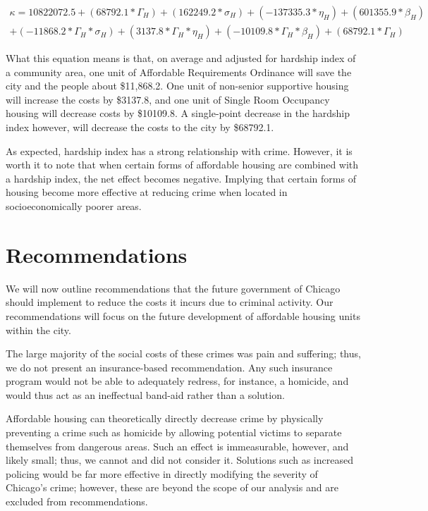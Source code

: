 \documentclass{article}
\begin{document}
\begin{onehalfspacing}
\begin{multline*}
    \kappa = 10822072.5 + (68792.1 * \Gamma_H) + (162249.2 * \sigma_H) + (-137335.3 * \eta_H) + (601355.9 * \beta_H) \\
    + (-11868.2 * \Gamma_H * \sigma_H) + (3137.8 * \Gamma_H * \eta_H) + (-10109.8 * \Gamma_H * \beta_H) + (68792.1 * \Gamma_H)
\end{multline*}

What this equation means is that, on average and adjusted for hardship index of a community area, one unit of Affordable Requirements Ordinance will save the city and the people about \$11,868.2. One unit of non-senior supportive housing will increase the costs by \$3137.8, and one unit of Single Room Occupancy housing will decrease costs by \$10109.8. A single-point decrease in the hardship index however, will decrease the costs to the city by \$68792.1.

As expected, hardship index has a strong relationship with crime. However, it is worth it to note that when certain forms of affordable housing are combined with a hardship index, the net effect becomes negative. Implying that certain forms of housing become more effective at reducing crime when located in socioeconomically poorer areas.

\section{Recommendations}
We will now outline recommendations that the future government of Chicago should implement to reduce the costs it incurs due to criminal activity. Our recommendations will focus on the future development of affordable housing units within the city. 

The large majority of the social costs of these crimes was pain and suffering; thus, we do not present an insurance-based recommendation. Any such insurance program would not be able to adequately redress, for instance, a homicide, and would thus act as an ineffectual band-aid rather than a solution.

Affordable housing can theoretically directly decrease crime by physically preventing a crime such as homicide by allowing potential victims to separate themselves from dangerous areas. Such an effect is immeasurable, however, and likely small; thus, we cannot and did not consider it. Solutions such as increased policing would be far more effective in directly modifying the severity of Chicago's crime; however, these are beyond the scope of our analysis and are excluded from recommendations.


\end{onehalfspacing}
\end{document}
